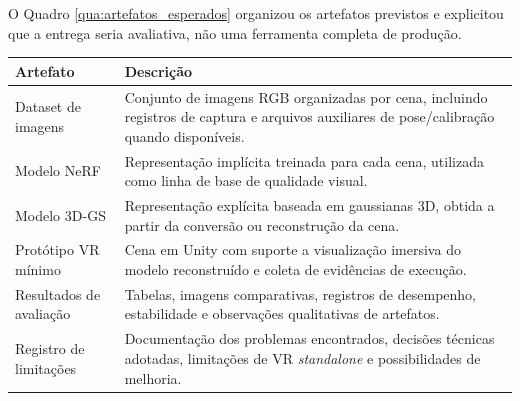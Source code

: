 O Quadro \ref{qua:artefatos_esperados} organizou os artefatos previstos e explicitou que a entrega seria avaliativa, não uma ferramenta completa de produção.

\begin{quadro}[H]
\centering
\footnotesize
\caption{Artefatos esperados do projeto.}
\label{qua:artefatos_esperados}
\renewcommand{\arraystretch}{1.2}
\begin{tabularx}{\textwidth}{|p{3.3cm}|X|}
\hline
\textbf{Artefato} & \textbf{Descrição} \\ \hline

Dataset de imagens & Conjunto de imagens RGB organizadas por cena, incluindo registros de captura e arquivos auxiliares de pose/calibração quando disponíveis. \\ \hline

Modelo NeRF & Representação implícita treinada para cada cena, utilizada como linha de base de qualidade visual. \\ \hline

Modelo 3D-GS & Representação explícita baseada em gaussianas 3D, obtida a partir da conversão ou reconstrução da cena. \\ \hline

Protótipo VR mínimo & Cena em Unity com suporte a visualização imersiva do modelo reconstruído e coleta de evidências de execução. \\ \hline

Resultados de avaliação & Tabelas, imagens comparativas, registros de desempenho, estabilidade e observações qualitativas de artefatos. \\ \hline

Registro de limitações & Documentação dos problemas encontrados, decisões técnicas adotadas, limitações de VR \textit{standalone} e possibilidades de melhoria. \\ \hline

\end{tabularx}
\end{quadro}
